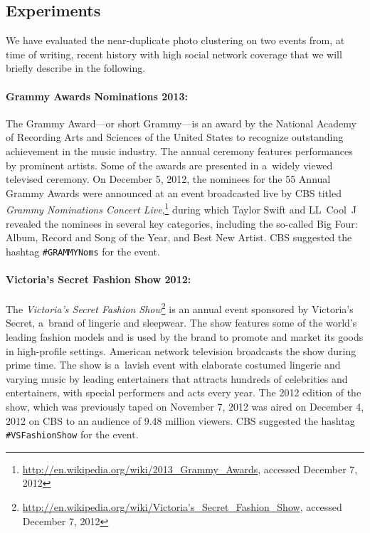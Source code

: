 \subsection{Experiments}

We have evaluated the near-duplicate photo clustering
on two events from, at time of writing, recent history with high social network coverage
that we will briefly describe in the following.

\paragraph{Grammy Awards Nominations 2013:}

The Grammy Award---or short Grammy---is an award by
the National Academy of Recording Arts and Sciences of the United States
to recognize outstanding achievement in the music industry.
The annual ceremony features performances by prominent artists.
Some of the awards are presented in a~widely viewed televised ceremony.
On December 5, 2012, the nominees for the 55 Annual Grammy Awards
were announced at an event broadcasted live by CBS
titled \emph{Grammy Nominations Concert
Live},\footnote{\url{http://en.wikipedia.org/wiki/2013_Grammy_Awards},
accessed December 7, 2012}
during which Taylor Swift and LL~Cool~J revealed the nominees
in several key categories, including the so-called Big Four:
Album, Record and Song of the Year, and Best New Artist.
CBS suggested the hashtag \texttt{\#GRAMMYNoms} for the event.

\paragraph{Victoria's Secret Fashion Show 2012:}
\label{sec:vsfashionshow}

The \emph{Victoria's Secret Fashion
Show}\footnote{\url{http://en.wikipedia.org/wiki/Victoria's_Secret_Fashion_Show},
accessed December 7, 2012} is an annual event
sponsored by Victoria's Secret, a~brand of lingerie and sleepwear.
The show features some of the world's leading fashion models
and is used by the brand to promote and market its goods in high-profile settings.
American network television broadcasts the show during prime time.
The show is a~lavish event with elaborate costumed lingerie and
varying music by leading entertainers
that attracts hundreds of celebrities and entertainers,
with special performers and acts every year.
The 2012 edition of the show,
which was previously taped on November 7, 2012
was aired on December 4, 2012 on CBS
to an audience of 9.48 million viewers.
CBS suggested the hashtag \texttt{\#VSFashionShow} for the event.


